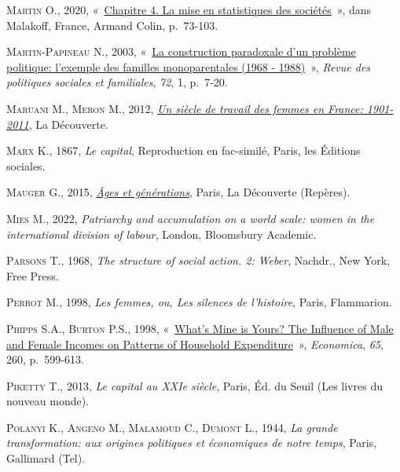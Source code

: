\documentclass[
  12pt,
]{book}
\newlength{\cslhangindent}
\newenvironment{CSLReferences}[2] %
 {\begin{list}{}{%
  \setlength{\itemindent}{0pt}
  \setlength{\leftmargin}{0pt}
  \setlength{\parsep}{0pt}
  \ifodd #1
   \setlength{\leftmargin}{\cslhangindent}
   \setlength{\itemindent}{-1\cslhangindent}
  \fi
  \setlength{\itemsep}{#2\baselineskip}}}
 {\end{list}}
\begin{document}
\begin{CSLReferences}{0}{1}
\textsc{Martin O.}, 2020,
{«~\href{https://www.cairn.info/l-empire-des-chiffres--9782200625719-page-73.htm}{Chapitre
4. La mise en statistiques des sociétés}~»}, dans Malakoff, France,
Armand Colin, p.~73‑103.

\textsc{Martin-Papineau N.}, 2003,
{«~\href{https://doi.org/10.3406/caf.2003.1983}{La construction
paradoxale d{'}un problème politique: l{'}exemple des familles
monoparentales (1968 - 1988)}~»}, \emph{Revue des politiques sociales et
familiales}, \emph{72}, 1, p.~7‑20.

\textsc{Maruani M.}, \textsc{Meron M.}, 2012,
\emph{\href{https://doi.org/10.3917/dec.marua.2012.01}{Un siècle de
travail des femmes en France: 1901- 2011}}, La Découverte.

\textsc{Marx K.}, 1867, \emph{Le capital}, Reproduction en fac-similé,
Paris, les Éditions sociales.

\textsc{Mauger G.}, 2015,
\emph{\href{https://www.cairn.info/ages-et-generations--9782707158888.htm}{Âges
et générations}}, Paris, La Découverte (Repères).

\textsc{Mies M.}, 2022, \emph{Patriarchy and accumulation on a world
scale: women in the international division of labour}, London,
Bloomsbury Academic.

\textsc{Parsons T.}, 1968, \emph{The structure of social action. 2:
Weber}, Nachdr., New York, Free Press.

\textsc{Perrot M.}, 1998, \emph{Les femmes, ou, Les silences de
l'histoire}, Paris, Flammarion.

\textsc{Phipps S.A.}, \textsc{Burton P.S.}, 1998,
{«~\href{https://doi.org/10.1111/1468-0335.00148}{What{'}s Mine is
Yours? The Influence of Male and Female Incomes on Patterns of Household
Expenditure}~»}, \emph{Economica}, \emph{65}, 260, p.~599‑613.

\textsc{Piketty T.}, 2013, \emph{Le capital au XXIe siècle}, Paris, Éd.
du Seuil (Les livres du nouveau monde).

\textsc{Polanyi K.}, \textsc{Angeno M.}, \textsc{Malamoud C.},
\textsc{Dumont L.}, 1944, \emph{La grande transformation: aux origines
politiques et économiques de notre temps}, Paris, Gallimard (Tel).


\end{CSLReferences}
\end{document}
